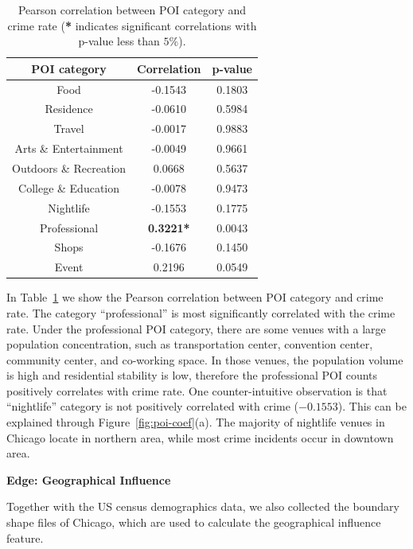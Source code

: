 \begin{table}[h]
\centering
\caption{Pearson correlation between POI category and crime rate (\textbf{*} indicates significant correlations with p-value less than $5\%$).}
\vspace{2mm}

\label{tb:poi-corr}
\begin{tabular}{|c ||c|c|}
\hline
POI category & Correlation & p-value \\ \hline \hline
Food & -0.1543 &  0.1803 \\ \hline
Residence &  -0.0610 &  0.5984 \\ \hline
Travel & -0.0017 &  0.9883 \\ \hline
Arts \& Entertainment & -0.0049 &  0.9661 \\ \hline
Outdoors \& Recreation &  0.0668 &  0.5637 \\ \hline
College \& Education & -0.0078 &  0.9473 \\ \hline
Nightlife &  -0.1553 &  0.1775 \\ \hline
Professional & \textbf{0.3221*} &  0.0043 \\ \hline
Shops & -0.1676 &  0.1450 \\ \hline
Event & 0.2196 &  0.0549  \\ \hline
\end{tabular}
\end{table}



In Table~\ref{tb:poi-corr} we show the Pearson correlation between POI category and crime rate. The category ``professional''  is most significantly correlated with the crime rate. Under the professional POI category, there are some venues with a large population concentration, such as transportation center, convention center, community center, and co-working space. In those venues, the  population volume is high and residential stability is low, therefore the professional POI counts positively correlates with crime rate.  One counter-intuitive observation is that ``nightlife'' category is not positively correlated with crime ($-0.1553$). This can be explained through Figure~\ref{fig:poi-coef}(a). The majority of nightlife venues in Chicago locate in northern area, while most crime incidents occur in downtown area.








\textbf{Edge: Geographical Influence}

Together with the US census demographics data, we also collected the boundary shape files of Chicago, which are used to calculate the geographical influence feature.

